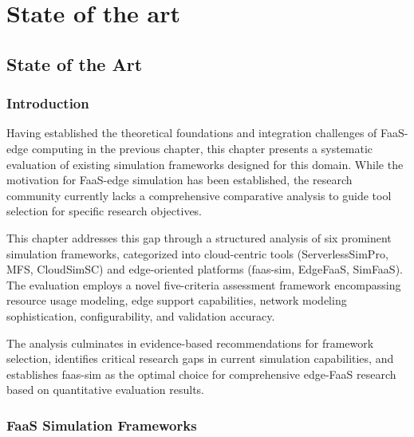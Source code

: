 \part{State of the art}

\chapter{State of the Art}

\section{Introduction}

Having established the theoretical foundations and integration challenges of FaaS-edge computing in the previous chapter, this chapter presents a systematic evaluation of existing simulation frameworks designed for this domain. While the motivation for FaaS-edge simulation has been established, the research community currently lacks a comprehensive comparative analysis to guide tool selection for specific research objectives.

This chapter addresses this gap through a structured analysis of six prominent simulation frameworks, categorized into cloud-centric tools (ServerlessSimPro, MFS, CloudSimSC) and edge-oriented platforms (faas-sim, EdgeFaaS, SimFaaS). The evaluation employs a novel five-criteria assessment framework encompassing resource usage modeling, edge support capabilities, network modeling sophistication, configurability, and validation accuracy.

The analysis culminates in evidence-based recommendations for framework selection, identifies critical research gaps in current simulation capabilities, and establishes faas-sim as the optimal choice for comprehensive edge-FaaS research based on quantitative evaluation results.

\section{FaaS Simulation Frameworks}

